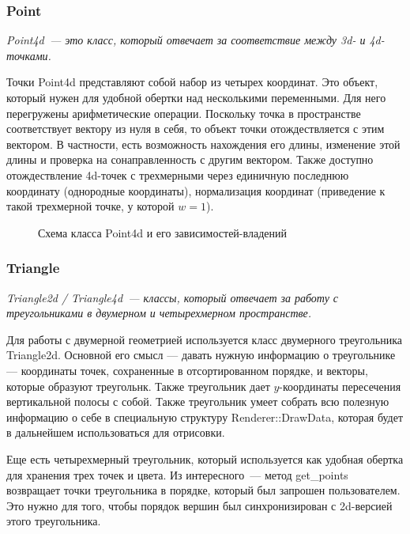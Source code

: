 \documentclass{article}
\begin{document}
\subsubsection{Point}

\textit{Point4d~--- это класс, который отвечает за соответствие между 3d- и 4d-точками.}
\medskip

Точки Point4d представляют собой набор из четырех координат. Это объект, который нужен для удобной обертки над несколькими переменными. Для него перегружены арифметические операции. Поскольку точка в пространстве соответствует вектору из нуля в себя, то объект точки отождествляется с этим вектором. В частности, есть возможность нахождения его длины, изменение этой длины и проверка на сонаправленность с другим вектором. Также доступно отождествление 4d-точек с трехмерными через единичную последнюю координату (однородные координаты), нормализация координат (приведение к такой трехмерной точке, у которой $w = 1$).	

\begin{center}
\begin{figure}[H]
\caption{Схема класса Point4d и его зависимостей-владений}
\label{ris:image}
\end{figure}
\end{center}
\newpage
\subsubsection{Triangle}

\textit{Triangle2d / Triangle4d~--- классы, который отвечает за работу с треугольниками в двумерном и четырехмерном пространстве.}
\medskip

Для работы с двумерной геометрией используется класс двумерного треугольника Triangle2d. Основной его смысл — давать нужную информацию о треугольнике — координаты точек, сохраненные в отсортированном порядке, и векторы, которые образуют треугольнк. Также треугольник дает $y$-координаты пересечения вертикальной полосы с собой. Также треугольник умеет собрать всю полезную информацию о себе в специальную структуру Renderer::DrawData, которая будет в дальнейшем использоваться для отрисовки.

Еще есть четырехмерный треугольник, который используется как удобная обертка для хранения трех точек и цвета. Из интересного~--- метод get\_points возвращает точки треугольника в порядке, который был запрошен пользователем. Это нужно для того, чтобы порядок вершин был синхронизирован с 2d-версией этого треугольника.
\end{document}
